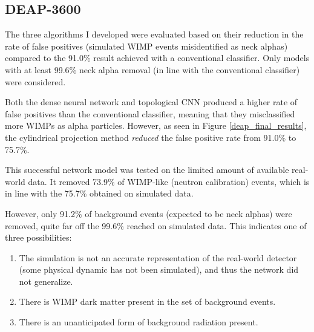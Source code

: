 \documentclass[12pt]{article}
\begin{document}
\subsection{DEAP-3600}

The three algorithms I developed were evaluated based on their reduction in the rate of false positives (simulated WIMP events misidentified as neck alphas) compared to the 91.0\% result achieved with a conventional classifier. Only models with at least 99.6\% neck alpha removal (in line with the conventional classifier) were considered.

Both the dense neural network and topological CNN produced a higher rate of false positives than the conventional classifier, meaning that they misclassified more WIMPs as alpha particles. However, as seen in Figure \ref{deap_final_results}, the cylindrical projection method \textit{reduced} the false positive rate from 91.0\% to 75.7\%.

This successful network model was tested on the limited amount of available real-world data. It removed 73.9\% of WIMP-like (neutron calibration) events, which is in line with the 75.7\% obtained on simulated data.

However, only 91.2\% of background events (expected to be neck alphas) were removed, quite far off the 99.6\% reached on simulated data. This indicates one of three possibilities:

\begin{enumerate}
    \item The simulation is not an accurate representation of the real-world detector (some physical dynamic has not been simulated), and thus the network did not generalize.
    \item There is WIMP dark matter present in the set of background events.
    \item There is an unanticipated form of background radiation present.
\end{enumerate}
\end{document}
